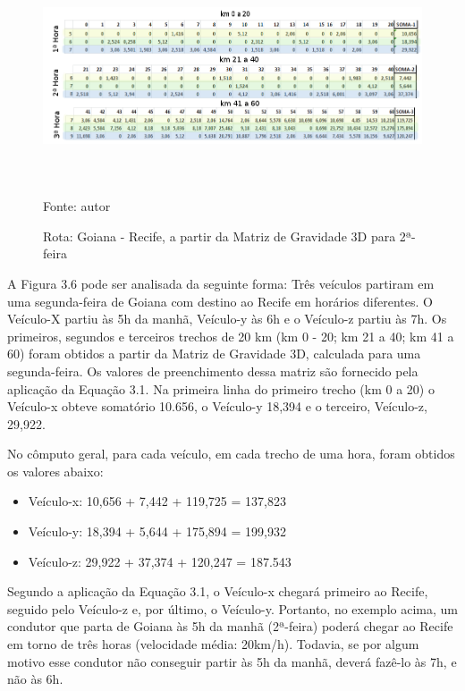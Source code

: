 \begin{figure}[ht]
	\centering
	\caption{Rota: Goiana - Recife, a partir da Matriz de Gravidade 3D para 2ª-feira}
	\includegraphics[width=160mm, height=70mm]{Figuras/Metodologia/RotaExemplo.png}\\
	\tiny Fonte: autor
\end{figure}

A Figura 3.6 pode ser analisada da seguinte forma:
 Três veículos partiram em uma segunda-feira de Goiana com destino ao Recife em horários diferentes. O Veículo-X partiu às 5h da manhã, Veículo-y às 6h e o Veículo-z partiu às 7h. 
 Os primeiros, segundos e terceiros trechos de 20 km (km 0 - 20; km 21 a 40; km 41 a 60) foram obtidos a partir da Matriz de Gravidade 3D, calculada para uma segunda-feira. Os valores de preenchimento dessa matriz são fornecido pela aplicação da Equação 3.1. Na primeira linha do primeiro trecho (km 0 a 20) o Veículo-x obteve somatório 10.656, o Veículo-y 18,394 e o terceiro, Veículo-z, 29,922.
 
 No cômputo geral, para cada veículo, em cada trecho de uma hora, foram obtidos os valores abaixo:
 
 \begin{itemize}
 	\item Veículo-x: 10,656 +  7,442 + 119,725 = 137,823
 	\item Veículo-y: 18,394 +  5,644 + 175,894 = 199,932
 	\item Veículo-z: 29,922 + 37,374 + 120,247 = 187.543
 \end{itemize} 
 
 
 Segundo a aplicação da Equação 3.1, o Veículo-x chegará primeiro ao Recife, seguido pelo Veículo-z e, por último, o Veículo-y. Portanto, no exemplo acima, um condutor que parta de Goiana às 5h da manhã (2ª-feira) poderá chegar ao Recife em torno de três horas (velocidade média: 20km/h). Todavia, se por algum motivo esse condutor não conseguir partir às 5h da manhã, deverá fazê-lo às 7h, e não às 6h. 
 
 
